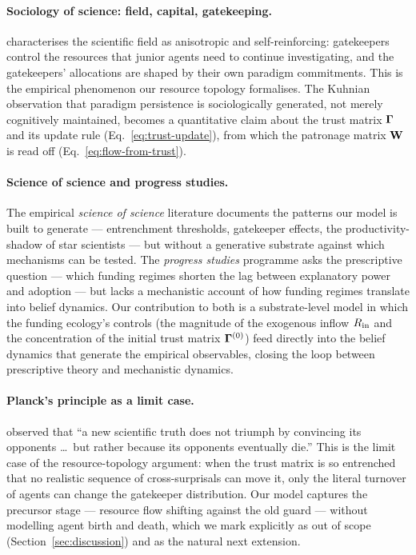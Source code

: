 \paragraph{Sociology of science: field, capital, gatekeeping.}
\citet{bourdieu1975ScientificField} characterises the scientific field
as anisotropic and self-reinforcing: gatekeepers control the
resources that junior agents need to continue investigating, and the
gatekeepers' allocations are shaped by their own paradigm
commitments. This is the empirical phenomenon our resource topology
formalises. The Kuhnian observation \citep{kuhn1962Structure} that
paradigm persistence is sociologically generated, not merely
cognitively maintained, becomes a quantitative claim about the trust
matrix $\boldsymbol{\Gamma}$ and its update rule (Eq.~\ref{eq:trust-update}),
from which the patronage matrix $\mathbf{W}$ is read off
(Eq.~\ref{eq:flow-from-trust}).

\paragraph{Science of science and progress studies.}
The empirical \emph{science of science} literature
\citep{wang2021ScienceOfScience, azoulay2019StarsShadow} documents the
patterns our model is built to generate --- entrenchment thresholds,
gatekeeper effects, the productivity-shadow of star scientists --- but
without a generative substrate against which mechanisms can be tested.
The \emph{progress studies} programme \citep{collison2019ProgressStudies}
asks the prescriptive question --- which funding regimes shorten the
lag between explanatory power and adoption --- but lacks a mechanistic
account of how funding regimes translate into belief dynamics. Our
contribution to both is a substrate-level model in which the funding
ecology's controls (the magnitude of the exogenous inflow
$R_{\mathrm{in}}$ and the concentration of the initial trust matrix
$\boldsymbol{\Gamma}^{(0)}$) feed directly into the belief dynamics that
generate the empirical observables, closing the loop between
prescriptive theory and mechanistic dynamics.

\paragraph{Planck's principle as a limit case.}
\citet{planck1949Autobiography} observed that ``a new scientific truth
does not triumph by convincing its opponents \dots\ but rather because
its opponents eventually die.'' This is the limit case of the
resource-topology argument: when the trust matrix is so entrenched
that no realistic sequence of cross-surprisals can move it, only the
literal turnover of agents can change the gatekeeper distribution. Our model captures the
precursor stage --- resource flow shifting against the old guard ---
without modelling agent birth and death, which we mark explicitly as
out of scope (Section~\ref{sec:discussion}) and as the natural next
extension.
